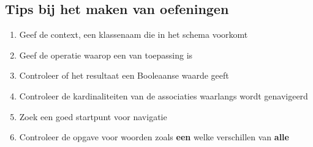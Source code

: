\documentclass[../main.tex]{subfiles}
\begin{document}
\subsection{Tips bij het maken van oefeningen}

\begin{enumerate}
	\item Geef de context, een klassenaam die in het schema voorkomt
	\item Geef de operatie waarop een  van toepassing is
	\item Controleer of het resultaat een Booleaanse waarde geeft
	\item Controleer de kardinaliteiten van de associaties waarlangs wordt genavigeerd
	\item Zoek een goed startpunt voor navigatie
	\item Controleer de opgave voor woorden zoals \textbf{een} welke verschillen van \textbf{alle}
\end{enumerate}
\end{document}
